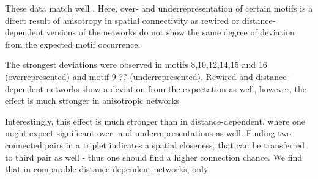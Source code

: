 These data match well . Here, over- and underrepresentation of certain
motifs is a direct result of anisotropy in spatial connectivity as
rewired or distance-dependent versions of the networks do not show the
same degree of deviation from the expected motif occurrence.

The strongest deviations were
observed in motifs 8,10,12,14,15 and 16 (overrepresented) and motif 9 ??
(underrepresented). Rewired and distance-dependent networks show a
deviation from the expectation as well, however, the effect is much
stronger in anisotropic networks

Interestingly, this effect is much stronger than in
distance-dependent, where one might expect significant over- and
underrepresentations as well. Finding two connected pairs in a triplet
indicates a spatial closeness, that can be transferred to third pair
as well - thus one should find a higher connection chance. We find
that in comparable distance-dependent networks, only



